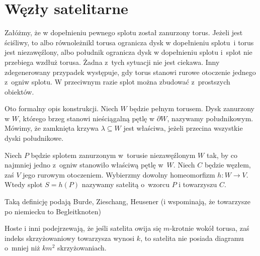 
\section{Węzły satelitarne}

Załóżmy, że w dopełnieniu pewnego splotu został zanurzony torus.
Jeżeli jest ściśliwy, to albo równoleżnikl torusa ogranicza dysk w dopełnieniu splotu~i torus jest niezawęźlony, albo południk ogranicza dysk w dopełnieniu splotu i~splot nie przebiega wzdłuż torusa.
Żadna z~tych sytuacji nie jest ciekawa.
Inny zdegenerowany przypadek występuje, gdy torus stanowi rurowe otoczenie jednego z~ogniw splotu.
W przeciwnym razie splot można zbudować z~prostszych obiektów.

Oto formalny opis konstrukcji.
Niech $W$ będzie pełnym torusem.
Dysk zanurzony w $W$, którego brzeg stanowi nieściągalną pętlę w $\partial W$, nazywamy południkowym.
Mówimy, że zamknięta krzywa $\lambda \subseteq W$ jest właściwa, jeżeli przecina wszystkie dyski południkowe.

\begin{definition}
%
%
%
%
    Niech $P$ będzie splotem zanurzonym w~torusie niezawęźlonym $W$ tak, by co najmniej jedno z~ogniw stanowiło właściwą pętlę w~$W$.
    Niech $C$ będzie węzłem, zaś $V$ jego rurowym otoczeniem.
    Wybierzmy dowolny homeomorfizm $h \colon W \to V$.
    Wtedy splot $S = h(P)$ nazywamy satelitą o~wzorcu $P$ i towarzyszu $C$.
\end{definition}


Taką definicję podają Burde, Zieschang, Heusener \cite[s. 21]{burde2014} (i wspominają, że towarzysze po niemiecku to Begleitknoten)


Hoste i inni \cite{thistlethwaite1998} podejrzewają, że jeśli satelita owija się $m$-krotnie wokół torusa, zaś indeks skrzyżowaniowy towarzysza wynosi $k$, to satelita nie posiada diagramu o~mniej niż $km^2$ skrzyżowaniach.
%
%
%

